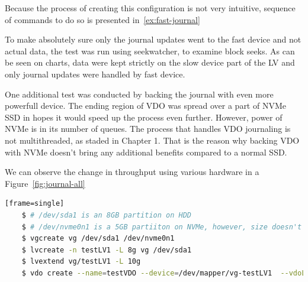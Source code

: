 \documentclass[
  color, %
  table, %
  lof,   %
  lot,   %
]{fithesis3}
\begin{document}
Because the process of creating this configuration is not very intuitive, sequence of commands to do so is presented in~\ref{ex:fast-journal}

To make absolutely sure only the journal updates went to the fast device and not actual data, the test was run using seekwatcher, to examine block seeks. As can be seen on charts, data were kept strictly on the slow device part of the LV and only journal updates were handled by fast device.

One additional test was conducted by backing the journal with even more powerfull device. The ending region of VDO was spread over a part of NVMe SSD in hopes it would speed up the process even further. However, power of NVMe is in its number of queues. The process that handles VDO journaling is not multithreaded, as staded in Chapter 1. That is the reason why backing VDO with NVMe doesn't bring any additional benefits compared to a normal SSD.

We can observe the change in throughput using various hardware in a Figure~\ref{fig:journal-all}



\begin{lstlisting}[language=bash, label={ex:fast-journal}, caption={Creating a volume with last reagion on NVMe device}][frame=single]
    $ # /dev/sda1 is an 8GB partition on HDD
    $ # /dev/nvme0n1 is a 5GB partiiton on NVMe, however, size doesn't matter since we're only using first 2GB
    $ vgcreate vg /dev/sda1 /dev/nvme0n1
    $ lvcreate -n testLV1 -L 8g vg /dev/sda1
    $ lvextend vg/testLV1 -L 10g
    $ vdo create --name=testVDO --device=/dev/mapper/vg-testLV1  --vdoLogicalSize=80g
\end{lstlisting}
\end{document}
